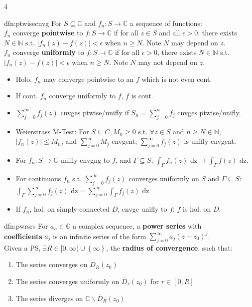 \documentclass[landscape, 8pt]{extarticle}
\begin{document}
\begin{multicols*}{4}
		
		\begin{dfn}{dfn:ptwisecnvg}{ }
			For $S \subseteq \mathbb{C}$ and $f_n : S \to \mathbb{C}$ a sequence of functions:\\
				$f_n$ converge \textbf{pointwise} to $f: S \to \mathbb{C}$ if for all $z \in S$ and all $\epsilon > 0$, there exists $N \in \mathbb{N}$ s.t. $\left|f_n(z) - f(z) \right| <\epsilon$ when $n \ge N$. Note $N$ may depend on $z$.\\
				$f_n$ converge \textbf{uniformly} to $f: S \to \mathbb{C}$ if for all $\epsilon > 0$, there exists $N \in \mathbb{N}$ s.t. $\left|f_n(z) - f(z) \right| <\epsilon$ when $n \ge N$. Note $N$ may not depend on $z$.
				\begin{itemize}
				\item Holo. $f_n$ may converge pointwise to an $f$ which is not even cont.
				\item If cont. $f_n$ converge uniformly to $f$, $f$ is cont.
				\item $\sum_{j=0}^{\infty}f_j(z)$ cnvges ptwise/unifly if $S_n = \sum_{j=0}^{n}f_j$ cnvges ptwise/unifly.
				\item Weierstrass M-Test: For $S \subseteq C, M_n \ge 0$ s.t. $\forall z \in S$ and $n \ge N \in \mathbb{N}$, $\left|f_n(z)\right| \le M_n$, and $\sum_{j=0}^{\infty}M_j$ cnvgent; $\sum_{j=0}^{\infty}f_j(z)$ is unifly cnvgent.
				\item For $f_n : S \to \mathbb{C}$ unifly cnvgng to $f$, and $\Gamma \subseteq S$; $\int_{\Gamma}f_n(z) \text{ dz} \to \int_{\Gamma}f(z) \text{ dz}$.
				\item For continuous $f_n$ s.t. $\sum_{j=0}^{\infty}f_j(z)$ converges uniformly on $S$ and $\Gamma \subseteq S$:\\
				$\int_{\Gamma}\sum_{j=0}^{\infty}f_j(z) \text{ dz} = \sum_{j=0}^{\infty}\int_{\Gamma}f_j(z) \text{ dz}$ 
				\item If $f_n$, hol. on simply-connected $D$, cnvge unifly to $f$: $f$ is hol. on $D$.
				
			\end{itemize}
			
			
		\end{dfn}
		
		
		\begin{dfn}{dfn:pwrsrs}{ }
			For $a_n \in \mathbb{C}$ a complex sequence, a \textbf{power series} with \\ \textbf{coefficients} $a_j$ is an infinite series of the form $\sum_{j=0}^{\infty}a_j (z-z_0)^j$.\\
			Given a PS, $\exists R \in [0, \infty) \cup \left\{\infty\right\}$, the \textbf{radius of convergence}, such that:
			\begin{enumerate}[label=(\roman*)]
				\item The series converges on $D_R(z_0)$
				\item The series converges uniformly on $\overline{D}_r(z_0)$ for $r \in [0, R]$
				\item The series diverges on $\mathbb{C} \backslash \overline{D}_R(z_0)$
			\end{enumerate}
			

\end{dfn}
\end{multicols*}
\end{document}
